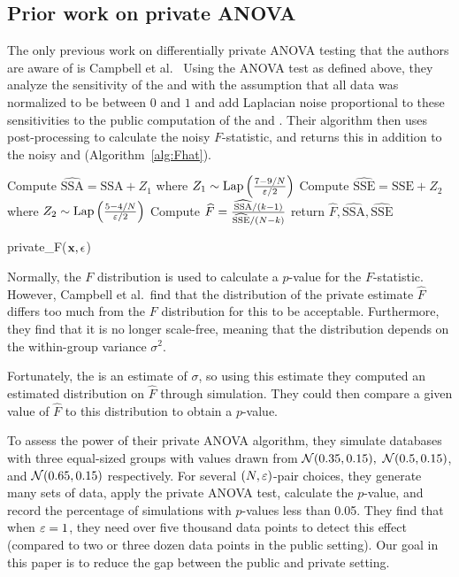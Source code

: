 
\subsection{Prior work on private ANOVA}

The only previous work on differentially private ANOVA testing that the authors are aware of is Campbell et al.~\cite{campbell2018diffprivanova} Using the ANOVA test as defined above, they analyze the sensitivity of the \ssa and \sse with the assumption that all data was normalized to be between $0$ and $1$ and add Laplacian noise proportional to these sensitivities to the public computation of the \ssa and \sse. Their algorithm then uses post-processing to calculate the noisy $F$-statistic, and returns this in addition to the noisy \ssa and \sse (Algorithm~\ref{alg:Fhat}). 
\begin{algorithm}
    \begin{algorithmic}
        \STATE Compute $\widehat{\text{SSA}} = \text{SSA} + Z_1$ where $Z_1\sim\text{Lap}\left(\frac{7 - 9/N}{\varepsilon/2}\right)$
        \STATE Compute $\widehat{\text{SSE}} = \text{SSE} + Z_2$ where $Z_2\sim\text{Lap}\left(\frac{5-4/N}{\varepsilon/2}\right)$
        \STATE Compute $\widehat{F} = \frac{\widehat{\text{SSA}}/(k-1)}{\widehat{\text{SSE}}/(N-k)}$
        \STATE return $\widehat{F}, \widehat{\text{SSA}}, \widehat{\text{SSE}}$
    \end{algorithmic}
    \caption{private\_F($\mathbf{x}, \epsilon$)} 
     \label{alg:Fhat}
\end{algorithm}

Normally, the $F$ distribution is used to calculate a $p$-value for the $F$-statistic. However, Campbell et al.~find that the distribution of the private estimate $\widehat{F}$ differs too much from the $F$ distribution for this to be acceptable.  Furthermore, they find that it is no longer scale-free, meaning that the distribution depends on the within-group variance $\sigma^2$.  

Fortunately, the \sse is an estimate of $\sigma$, so using this estimate they computed an estimated distribution on $\widehat{F}$ through simulation. They could then compare a given value of $\widehat{F}$ to this distribution to obtain a $p$-value.

To assess the power of their private ANOVA algorithm, they simulate databases with three equal-sized groups with values drawn from $\mathcal{N}(0.35, 0.15),$ $ \mathcal{N}(0.5, 0.15)$, and $\mathcal{N}(0.65, 0.15)$ respectively. For several $(N,\varepsilon)$-pair choices, they generate many sets of data, apply the private ANOVA test, calculate the $p$-value, and record the percentage of simulations with $p$-values less than 0.05. They find that when $\varepsilon = 1$, they need over five thousand data points to detect this effect (compared to two or three dozen data points in the public setting).  Our goal in this paper is to reduce the gap between the public and private setting.



